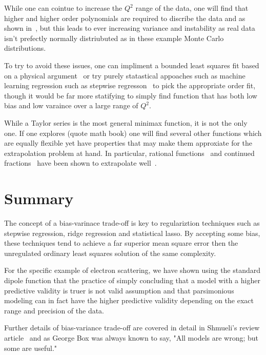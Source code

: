 \documentclass[10pt,aps,prc,twocolumn]{revtex4-1}
\begin{document}
While one can cointue to increase the $Q^2$ range of the data, one will find that higher and higher order polynomials are required
to discribe the data and as shown in~\cite{Kraus:2014qua}, but this leads to ever increasing variance and instability as real data
isn't prefectly normally distriubuted as in these example Monte Carlo distributions.

To try to avoid these issues, one can impliment a bounded least squares fit based on a physical argument~\cite{Horbatsch:2016ilr} 
or try purely statastical appoaches such as machine learning regression such as stepwise regresson~\cite{Higinbotham:rja} 
to pick the appropriate order fit, though it would be far more statifying to simply find function that has 
both low bias and low varaince over a large range of $Q^2$.

While a Taylor series is the most general minimax function, it is not the only one.    If one explores (quote math book) one 
will find several other functions which are equally flexible yet have properties that may make them approxiate for the 
extrapolation problem at hand.   In particular, rational functions~\cite{Kelly:2004hm,PUckett:2017flj} 
and continued fractions~\cite{} have been shown to extrapolate well~\cite{}.

%
%


\section{Summary}

The concept of a bias-varinace trade-off is key to regulariztion techniques such as stepwise regression, ridge regression and
statistical lasso.    By accepting some bias, these techniques tend to achieve a far superior mean square error then
the unregulated ordinary least squares solution of the same complexity.     

For the specific example of electron scattering, we have shown using the standard dipole function that 
the practice of simply concluding that a model with a higher predictive validity is truer is not valid 
assumption and that parsimonious modeling can in fact have the higher predictive validity depending on 
the exact range and precision of the data.

Further details of bias-variance trade-off are covered in detail in Shmueli's review article~\cite{Shmueli:2010}  
and as George Box was always known to say, "All models are wrong; but some are useful."


\end{document}
